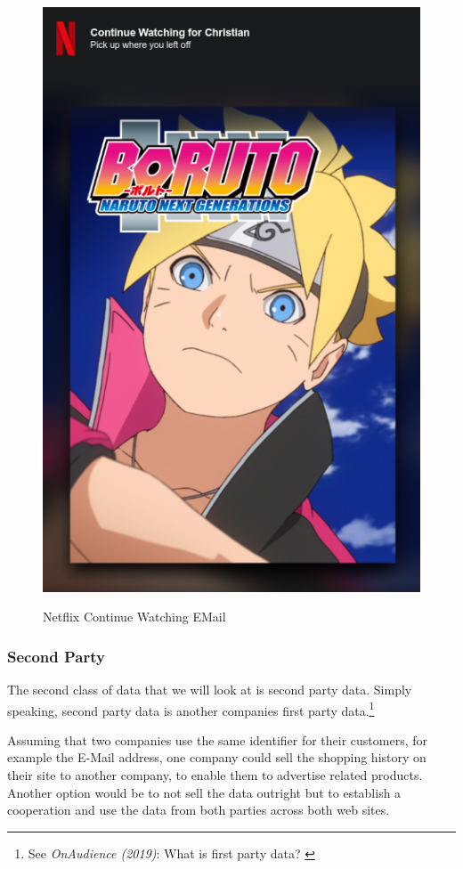 \begin{figure}[H]
\centering
\caption {Netflix Continue Watching EMail}
\includegraphics[scale=0.6]{images/continue-boruto.png}
\label{fig:boruto}
\end{figure}

\subsubsection{Second Party}

The second class of data that we will look at is second party data. Simply speaking, second party data is another companies first party data.\footnote{See \textit{OnAudience (2019)}: What is first party data? \cite{firstParty}}

Assuming that two companies use the same identifier for their customers, for example the E-Mail address, one company could sell the shopping history on their site to another company, to enable them to advertise related products. Another option would be to not sell the data outright but to establish a cooperation and use the data from both parties across both web sites.

